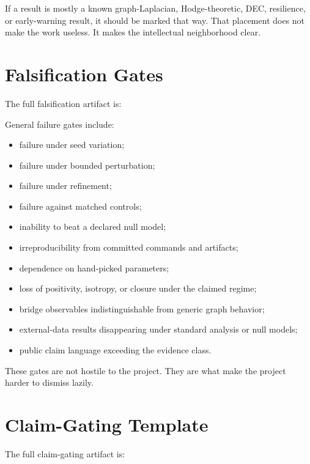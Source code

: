 \documentclass[11pt]{article}
\begin{document}
If a result is mostly a known graph-Laplacian, Hodge-theoretic, DEC, resilience, or early-warning result, it should be marked that way. That placement does not make the work useless. It makes the intellectual neighborhood clear.

\section{Falsification Gates}

The full falsification artifact is:

\begin{quote}
\end{quote}

General failure gates include:

\begin{itemize}
\item failure under seed variation;
\item failure under bounded perturbation;
\item failure under refinement;
\item failure against matched controls;
\item inability to beat a declared null model;
\item irreproducibility from committed commands and artifacts;
\item dependence on hand-picked parameters;
\item loss of positivity, isotropy, or closure under the claimed regime;
\item bridge observables indistinguishable from generic graph behavior;
\item external-data results disappearing under standard analysis or null models;
\item public claim language exceeding the evidence class.
\end{itemize}

These gates are not hostile to the project. They are what make the project harder to dismiss lazily.

\section{Claim-Gating Template}

The full claim-gating artifact is:

\begin{quote}
\end{quote}
\end{document}
